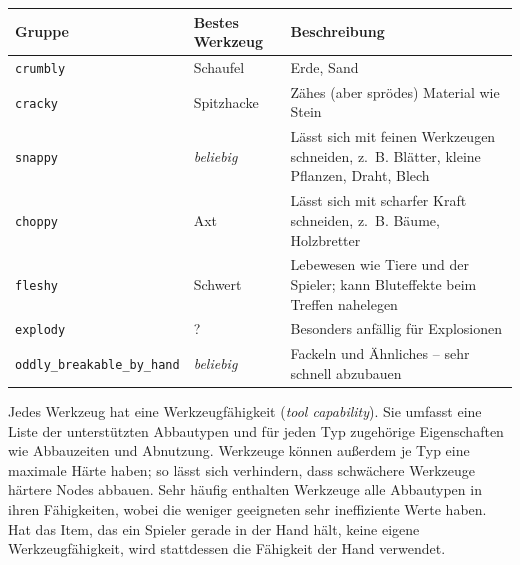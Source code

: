 \begin{longtable}[]{@{}
  >{\raggedright\arraybackslash}p{}
  >{\raggedright\arraybackslash}p{}
  >{\raggedright\arraybackslash}p{}@{}}
\toprule\noalign{}
\begin{minipage}[b]{\linewidth}\raggedright
Gruppe
\end{minipage} & \begin{minipage}[b]{\linewidth}\raggedright
Bestes Werkzeug
\end{minipage} & \begin{minipage}[b]{\linewidth}\raggedright
Beschreibung
\end{minipage} \\
\midrule\noalign{}
\endhead
\bottomrule\noalign{}
\endlastfoot
\texttt{crumbly} & Schaufel & Erde, Sand \\
\texttt{cracky} & Spitzhacke & Zähes (aber sprödes) Material wie
Stein \\
\texttt{snappy} & \emph{beliebig} & Lässt sich mit feinen Werkzeugen
schneiden, z.~B. Blätter, kleine Pflanzen, Draht, Blech \\
\texttt{choppy} & Axt & Lässt sich mit scharfer Kraft schneiden, z.~B.
Bäume, Holzbretter \\
\texttt{fleshy} & Schwert & Lebewesen wie Tiere und der Spieler; kann
Bluteffekte beim Treffen nahelegen \\
\texttt{explody} & ? & Besonders anfällig für Explosionen \\
\texttt{oddly\_\allowbreak{}breakable\_\allowbreak{}by\_\allowbreak{}hand}
& \emph{beliebig} & Fackeln und Ähnliches -- sehr schnell abzubauen \\
\end{longtable}

Jedes Werkzeug hat eine Werkzeugfähigkeit (\emph{tool capability}). Sie
umfasst eine Liste der unterstützten Abbautypen und für jeden Typ
zugehörige Eigenschaften wie Abbauzeiten und
Abnutzung. Werkzeuge können außerdem je Typ
eine maximale Härte haben; so lässt sich verhindern, dass schwächere
Werkzeuge härtere Nodes abbauen. Sehr häufig enthalten Werkzeuge alle
Abbautypen in ihren Fähigkeiten, wobei die weniger geeigneten sehr
ineffiziente Werte haben. Hat das Item, das ein Spieler gerade in der
Hand hält, keine eigene Werkzeugfähigkeit, wird stattdessen die
Fähigkeit der Hand verwendet.

